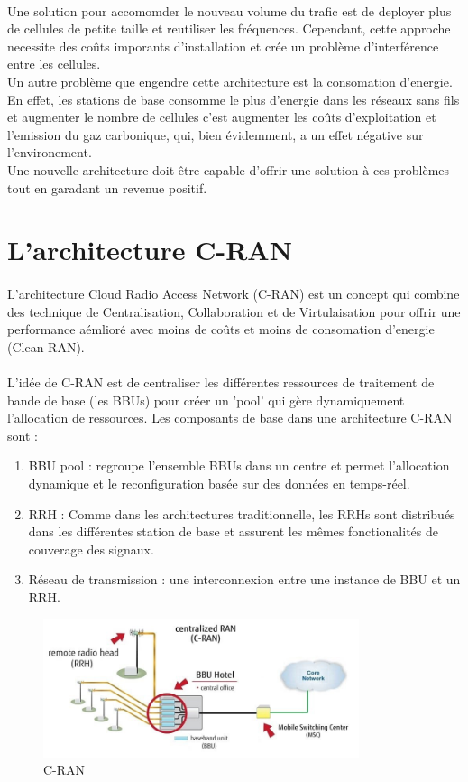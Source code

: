 \documentclass{report}
\begin{document}
\paragraph{}
Une solution pour accomomder le nouveau volume du trafic est de deployer plus de cellules de petite taille et reutiliser les fréquences. Cependant, cette approche 
necessite des coûts imporants d'installation et crée un problème d'interférence entre les cellules. \\
Un autre problème que engendre cette architecture est la consomation d'energie. En effet, les stations de base consomme le plus d'energie dans les réseaux sans fils et augmenter
le nombre de cellules c'est augmenter les coûts d'exploitation et l'emission du gaz carbonique, qui, bien évidemment, a un effet négative sur l'environement.\\
Une nouvelle architecture doit être capable d'offrir une solution à ces problèmes tout en garadant un revenue positif.
\section{L'architecture C-RAN}
\paragraph{}
L'architecture Cloud Radio Access Network (C-RAN) est un concept qui combine des technique de Centralisation, Collaboration et de
Virtulaisation pour offrir une performance aémlioré avec moins de coûts et moins de consomation d'energie (Clean RAN).
\paragraph{}
L'idée de C-RAN est de centraliser les différentes ressources de traitement de bande de base (les BBUs) pour créer un 'pool' qui gère dynamiquement 
l'allocation de ressources. Les composants de base dans une architecture C-RAN sont :
\begin{enumerate}
  \item BBU pool : regroupe l’ensemble BBUs dans un centre et permet l’allocation dynamique et le reconfiguration basée sur des données en temps-réel.
  \item RRH : Comme dans les architectures traditionnelle, les RRHs sont distribués dans les différentes station de base et assurent les mêmes fonctionalités de couverage des signaux.
  \item Réseau de transmission : une interconnexion entre une instance de BBU et un RRH.
\end{enumerate}
\begin{figure}[h]
  \centering
  \includegraphics[width=25em]{images/C-RAN.jpg} 
  \caption{C-RAN}
\end{figure} 
\end{document}
